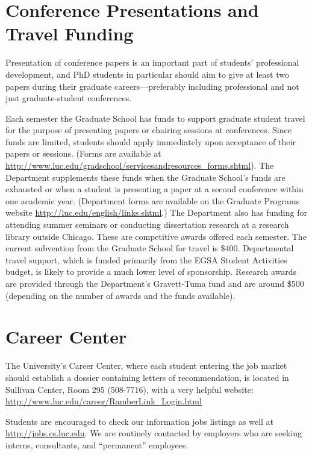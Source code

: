 \documentclass[letterpaper,10pt,english]{sphinxmanual}
\begin{document}
\section{Conference Presentations and Travel Funding}
\label{general:conference-presentations-and-travel-funding}
Presentation of conference papers is an important part of students’ professional development, and PhD students in particular should aim to give at least two papers during their graduate careers—preferably including professional and not just graduate-student conferences.

Each semester the Graduate School has funds to support graduate student travel for the purpose of presenting papers or chairing sessions at conferences. Since funds are limited, students should apply immediately upon acceptance of their papers or sessions. (Forms are available at \href{http://www.luc.edu/gradschool/servicesandresources\_forms.shtml}{http://www.luc.edu/gradschool/servicesandresources\_forms.shtml}).  The Department supplements these funds when the Graduate School’s funds are exhausted or when a student is presenting a paper at a second conference within one academic year. (Department forms are available on the Graduate Programs website \href{http://luc.edu/english/links.shtml}{http://luc.edu/english/links.shtml}.) The Department also has funding for attending summer seminars or conducting dissertation research at a research library outside Chicago. These are competitive awards offered each semester. The current subvention from the Graduate School for travel is \$400. Departmental travel support, which is funded primarily from the EGSA Student Activities budget, is likely to provide a much lower level of sponsorship. Research awards are provided through the Department’s Gravett-Tuma fund and are around \$500 (depending on the number of awards and the funds available).


\section{Career Center}
\label{general:career-center}
The University’s Career Center, where each student entering the job market should establish a dossier containing letters of recommendation, is located in Sullivan Center, Room 295 (508-7716), with a very helpful website: \href{http://www.luc.edu/career/RamberLink\_Login.html}{http://www.luc.edu/career/RamberLink\_Login.html}

Students are encouraged to check our information jobs listings as well at \href{http://jobs.cs.luc.edu}{http://jobs.cs.luc.edu}. We are routinely contacted by employers who are seeking interns, consultants, and ``permanent'' employees.
\end{document}
